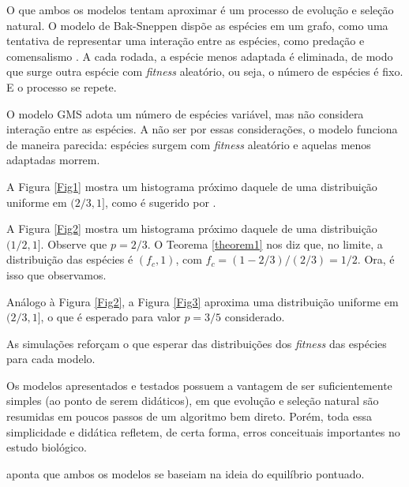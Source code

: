 \documentclass[10pt,brazil,english]{article}
\begin{document}
        O que ambos os modelos tentam aproximar é um processo de evolução e seleção natural.
        O modelo de Bak-Sneppen dispõe as espécies em um grafo, como uma tentativa de representar uma interação entre as espécies, como predação e comensalismo \cite{khouri2013estudos}.
        A cada rodada, a espécie menos adaptada é eliminada, de modo que surge outra espécie com \textit{fitness} aleatório, ou seja, o número de espécies é fixo.
        E o processo se repete.

        O modelo GMS adota um número de espécies variável, mas não considera interação entre as espécies.
        A não ser por essas considerações, o modelo funciona de maneira parecida: espécies surgem com \textit{fitness} aleatório e aquelas menos adaptadas morrem.

        A Figura \ref{Fig1} mostra um histograma próximo daquele de uma distribuição uniforme em $(2/3, 1]$, como é sugerido por .

        A Figura \ref{Fig2} mostra um histograma próximo daquele de uma distribuição $(1/2, 1]$. Observe que $p = 2/3$.
        O Teorema \ref{theorem1} nos diz que, no limite, a distribuição das espécies é $(f_c, 1)$, com $f_c = (1 - 2/3)/(2/3) = 1/2$.
        Ora, é isso que observamos.

        Análogo à Figura \ref{Fig2}, a Figura \ref{Fig3} aproxima uma distribuição uniforme em $(2/3, 1]$, o que é esperado para valor $p = 3/5$ considerado.

        As simulações reforçam o que esperar das distribuições dos \textit{fitness} das espécies para cada modelo.

        Os modelos apresentados e testados possuem a vantagem de ser suficientemente simples (ao ponto de serem didáticos), em que evolução e seleção natural são resumidas em poucos passos de um algoritmo bem direto.
        Porém, toda essa simplicidade e didática refletem, de certa forma, erros conceituais importantes no estudo biológico.

         aponta que ambos os modelos se baseiam na ideia do equilíbrio pontuado.

    
    
\end{document}
